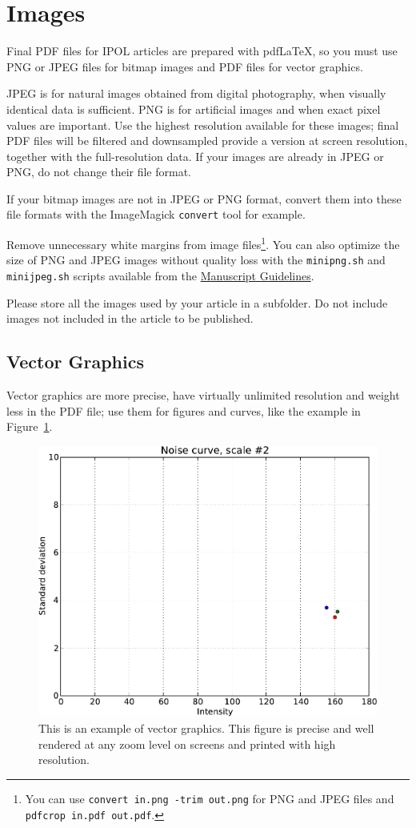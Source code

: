 \documentclass{ipol}
\begin{document}
\section{Images}

Final PDF files for IPOL articles are prepared with pdf\LaTeX, so you
must use PNG or JPEG files for bitmap images and PDF files for vector
graphics.

JPEG is for natural images obtained from digital photography, when
visually identical data is sufficient. PNG is for artificial images
and when exact pixel values are important.  Use the highest resolution
available for these images; final PDF files will be filtered and
downsampled provide a version at screen resolution, together with the
full-resolution data. If your images are already in JPEG or PNG, do
not change their file format.

If your bitmap images are not in JPEG or PNG format, convert them into
these file formats with the ImageMagick \verb|convert| tool for
example.

Remove unnecessary white margins from image files\footnote{You can use
  \verb|convert in.png -trim out.png| for PNG and JPEG files and
  \verb|pdfcrop in.pdf out.pdf|.}. You can also optimize the size of
PNG and JPEG images without quality loss with the \verb|minipng.sh| and
\verb|minijpeg.sh| scripts available from the
\href{\ipolLink}{Manuscript Guidelines}.

Please store all the images used by your article in a subfolder. Do
not include images not included in the article to be published.

\subsection{Vector Graphics}

Vector graphics are more precise, have virtually unlimited resolution
and weight less in the PDF file; use them for figures and curves, like
the example in Figure~\ref{fig:example}.

\begin{figure}[!htbp]
\begin{center}
\includegraphics[width=.5\linewidth]{./images/curve.pdf}
\caption{This is an example of vector graphics. This figure is precise
  and well rendered at any zoom level on screens and printed with high
  resolution.}
\label{fig:example}
\end{center}
\end{figure}
\end{document}
